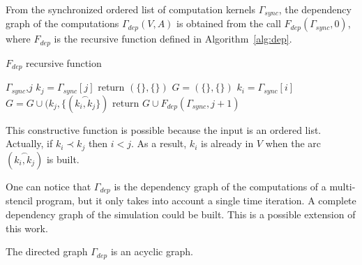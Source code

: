 \begin{mydef}
From the synchronized ordered list of computation kernels $\Gamma_{sync}$, the dependency graph of the computations $\Gamma_{dep}(V,A)$ is obtained from the call $F_{dep}(\Gamma_{sync},0)$, where $F_{dep}$ is the recursive function defined in Algorithm~\ref{alg:dep}.

\end{mydef}

\begin{algorithm}
\caption{$F_{dep}$ recursive function}
\label{alg:dep}
\begin{algorithmic}[1]
 {$\Gamma_{sync}$,$j$}
\State $k_j = \Gamma_{sync}[j]$
\State return $(\{\},\{\})$
\State $G=(\{\},\{\})$
\State $k_i = \Gamma_{sync}[i]$
\State $G = G \cup (k_j, \{(\overset{\frown}{k_i,k_j} \})$
\EndIf
\EndFor
\State return $G \cup F_{dep}(\Gamma_{sync},j+1)$
\EndIf
\EndProcedure
\end{algorithmic}
\end{algorithm}

This constructive function is possible because the input is an ordered list. Actually, if $k_i\prec k_j$ then $i<j$. As a result, $k_i$ is already in $V$ when the arc $(\overset{\frown}{k_i,k_j})$ is built.

One can notice that $\Gamma_{dep}$ is the dependency graph of the computations of a multi-stencil program, but it only takes into account a single time iteration. A complete dependency graph of the simulation could be built. This is a possible extension of this work.

\begin{myprop}
The directed graph $\Gamma_{dep}$ is an acyclic graph.
\end{myprop}


